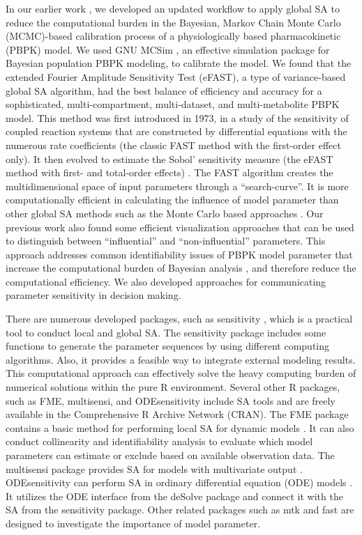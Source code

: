 \documentclass[preprint,12pt, a4paper]{elsarticle}
\begin{document}
In our earlier work \cite{fphar201800588}, we developed an updated
workflow to apply global SA to reduce the computational burden in the
Bayesian, Markov Chain Monte Carlo (MCMC)-based calibration process of a
physiologically based pharmacokinetic (PBPK) model. We used GNU MCSim
\cite{bois2009gnu}, an effective simulation package for Bayesian
population PBPK modeling, to calibrate the model. We found that the
extended Fourier Amplitude Sensitivity Test (eFAST), a type of
variance-based global SA algorithm, had the best balance of efficiency
and accuracy for a sophisticated, multi-compartment, multi-dataset, and
multi-metabolite PBPK model. This method was first introduced in 1973, 
\cite{cukier1973study} in a study of the sensitivity of coupled reaction systems
that are constructed by differential equations with the numerous rate
coefficients (the classic FAST method with the first-order
effect only). It then evolved to estimate the Sobol' sensitivity measure
(the eFAST method with first- and
total-order effects) \cite{saltelli1999quantitative}. The FAST algorithm creates the multidimensional
space of input parameters through a ``search-curve''. It is more
computationally efficient in calculating the influence of model
parameter than other global SA methods such as the Monte Carlo based
approaches \cite{jansen1999analysis, owen2013better}. Our previous work
also found some efficient visualization approaches that can be used to
distinguish between ``influential'' and ``non-influential'' parameters.
This approach addresses common identifiability issues of PBPK model
parameter that increase the computational burden of Bayesian analysis
\cite{garcia2015identifiability}, and therefore reduce the
computational efficiency. We also developed approaches for communicating
parameter sensitivity in decision making.

There are numerous developed packages, such as sensitivity
\cite{R-sensitivity}, which is a practical tool to conduct local and
global SA. The sensitivity package includes some functions to
generate the parameter sequences by using different computing
algorithms. Also, it provides a feasible way to integrate external
modeling results. This computational approach can effectively solve the
heavy computing burden of numerical solutions within the pure R
environment. Several other R packages, such as FME,
multisensi, and ODEsensitivity include SA tools and
are freely available in the Comprehensive R Archive Network (CRAN). The
FME package contains a basic method for performing local SA
for dynamic models \cite{JSSv033i03}. It can also conduct collinearity
and identifiability analysis to evaluate which model parameters can
estimate or exclude based on available observation data. The
multisensi package provides SA for models with multivariate
output \cite{R-multisensi}. ODEsensitivity can perform SA in
ordinary differential equation (ODE) models \cite{R-ODEsensitivity}. It
utilizes the ODE interface from the deSolve package and
connect it with the SA from the sensitivity package. Other
related packages such as mtk \cite{RJ-2015-031} and
fast \cite{R-fast} are designed to investigate the importance
of model parameter.
\end{document}
